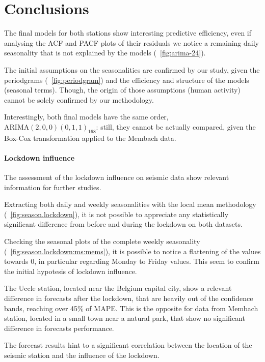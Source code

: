 \documentclass[12pt]{article}
\begin{document}
\section{Conclusions}
The final models for both stations show interesting predictive efficiency, even if analysing the ACF and PACF plots of their residuals we notice a remaining daily seasonality that is not explained by the models (\figurename~\ref{fig:arima-24}).

The initial assumptions on the seasonalities are confirmed by our study, given the periodgrams (\figurename~\ref{fig:periodgram}) and the efficiency and structure of the models (seasonal terms). Though, the origin of those assumptions (human activity) cannot be solely confirmed by our methodology.

Interestingly, both final models have the same order, $\mathrm{ARIMA}(2,0,0)(0,1,1)_{168}$: still, they cannot be actually compared, given the Box-Cox transformation applied to the Membach data.

\paragraph{Lockdown influence} The assessment of the lockdown influence on seismic data show relevant information for further studies.

Extracting both daily and weekly seasonalities with the local mean methodology (\figurename~\ref{fig:season.lockdown}), it is not possible to appreciate any statistically significant difference from before and during the lockdown on both datasets.

Checking the seasonal plots of the complete weekly seasonality (\figurename~\ref{fig:season.lockdown:ms:mems}), it is possible to notice a flattening of the values towards 0, in particular regarding Monday to Friday values. This seem to confirm the initial hypotesis of lockdown influence.

The Uccle station, located near the Belgium capital city, show a relevant difference in forecasts after the lockdown, that are heavily out of the confidence bands, reaching over 45\% of MAPE. This is the opposite for data from Membach station, located in a small town near a natural park, that show no significant difference in forecasts performance.

The forecast results hint to a significant correlation between the location of the seismic station and the influence of the lockdown.
\end{document}
